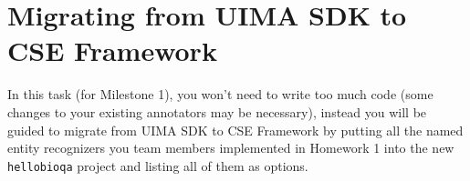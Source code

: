 
\chapter{Migrating from UIMA SDK to CSE Framework}

In this task (for Milestone 1), you won't need to write too much code (some
changes to your existing annotators may be necessary), instead you will be
guided to migrate from UIMA SDK to CSE Framework by putting all the named entity
recognizers you team members implemented in Homework 1 into the new
\texttt{hellobioqa} project and listing all of them as options.




 

